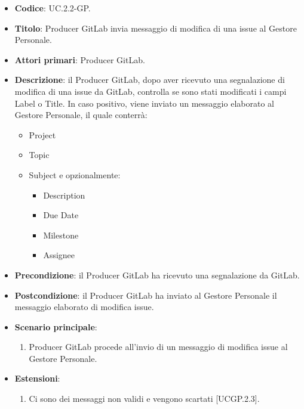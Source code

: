 				\begin{itemize}
					\item \textbf{Codice}: UC\theuccount.2.2-GP.
					\item \textbf{Titolo}: Producer GitLab invia messaggio di modifica di una issue al Gestore Personale.
					\item \textbf{Attori primari}: Producer GitLab.
					\item \textbf{Descrizione}: il Producer GitLab, dopo aver ricevuto una segnalazione di modifica di una issue da
					GitLab, controlla se sono stati modificati i campi Label o Title.
					In caso positivo, viene inviato un messaggio elaborato al Gestore Personale, il quale conterrà:
					\begin{itemize}
						\item Project
						\item Topic
						\item Subject e opzionalmente:
						\begin{itemize}
							\item Description
							\item Due Date
							\item Milestone
							\item Assignee
						\end{itemize}
					\end{itemize}
					\item \textbf{Precondizione}: il Producer GitLab ha ricevuto una segnalazione da GitLab.
					\item \textbf{Postcondizione}: il Producer GitLab ha inviato al Gestore Personale il messaggio elaborato di modifica issue.
					\item \textbf{Scenario principale}: 
					\begin{enumerate}
						\item Producer GitLab procede all'invio di un messaggio di modifica issue al Gestore Personale.
					\end{enumerate}
					\item \textbf{Estensioni}: 
					\begin{enumerate}
						\item Ci sono dei messaggi non validi e vengono scartati [UCGP\theuccount.2.3].
					\end{enumerate}
				\end{itemize}
		
